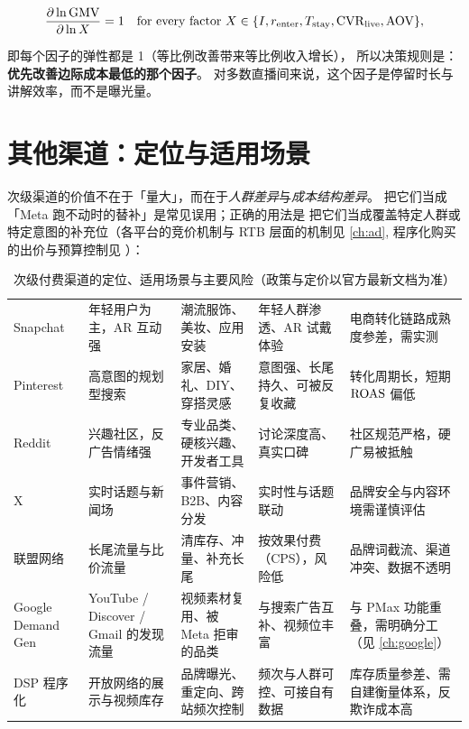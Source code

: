 \begin{equation}
\frac{\partial \ln \operatorname{GMV}}{\partial \ln X} = 1 \quad \text{for every factor } X \in \{I, r_{\text{enter}}, T_{\text{stay}}, \operatorname{CVR}_{\text{live}}, \operatorname{AOV}\},
\label{eq:liveelasticity}
\end{equation}

即每个因子的弹性都是 1（等比例改善带来等比例收入增长），
所以决策规则是：\textbf{优先改善边际成本最低的那个因子}。
对多数直播间来说，这个因子是停留时长与讲解效率，而不是曝光量。

\section{其他渠道：定位与适用场景}
\label{sec:meta-others}

次级渠道的价值不在于「量大」，而在于\emph{人群差异}与\emph{成本结构差异}。
把它们当成「Meta 跑不动时的替补」是常见误用；正确的用法是
把它们当成覆盖特定人群或特定意图的补充位（各平台的竞价机制与 RTB 层面的机制见 \cref{ch:ad},
程序化购买的出价与预算控制见 \cite{perlich2012rtb}）：

\begin{table}[htbp]
\centering
\caption{次级付费渠道的定位、适用场景与主要风险（政策与定价以官方最新文档为准）}
\label{tab:otherchannels}
\small
\begin{tabularx}{\textwidth}{L{2.1cm} L{2.6cm} L{3.0cm} L{2.6cm} Y}
\toprule
{} &  &  &  &  \\
\midrule
Snapchat & 年轻用户为主，AR 互动强 & 潮流服饰、美妆、应用安装 & 年轻人群渗透、AR 试戴体验 & 电商转化链路成熟度参差，需实测 \\
Pinterest & 高意图的规划型搜索 & 家居、婚礼、DIY、穿搭灵感 & 意图强、长尾持久、可被反复收藏 & 转化周期长，短期 $\operatorname{ROAS}$ 偏低 \\
Reddit & 兴趣社区，反广告情绪强 & 专业品类、硬核兴趣、开发者工具 & 讨论深度高、真实口碑 & 社区规范严格，硬广易被抵触 \\
X & 实时话题与新闻场 & 事件营销、B2B、内容分发 & 实时性与话题联动 & 品牌安全与内容环境需谨慎评估 \\
联盟网络 & 长尾流量与比价流量 & 清库存、冲量、补充长尾 & 按效果付费（CPS），风险低 & 品牌词截流、渠道冲突、数据不透明 \\
Google Demand Gen & YouTube / Discover / Gmail 的发现流量 & 视频素材复用、被 Meta 拒审的品类 & 与搜索广告互补、视频位丰富 & 与 PMax 功能重叠，需明确分工（见 \cref{ch:google}）\\
DSP 程序化 & 开放网络的展示与视频库存 & 品牌曝光、重定向、跨站频次控制 & 频次与人群可控、可接自有数据 & 库存质量参差、需自建衡量体系，反欺诈成本高 \\
\bottomrule
\end{tabularx}
\end{table}

